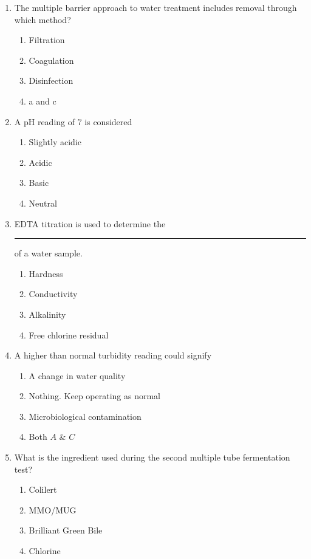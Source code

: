 \begin{enumerate}[1.]
\item  The multiple barrier approach to water treatment includes removal through which method?\\
\begin{enumerate}
\item Filtration\\
\item Coagulation\\
\item Disinfection\\
\item a and c
\end{enumerate}

\item  A pH reading of 7 is considered\\
\begin{enumerate}
\item Slightly acidic\\
\item Acidic\\
\item Basic\\
\item Neutral
\end{enumerate}

\item EDTA titration is used to determine the \rule{2cm}{0.3pt} of a water sample.
\begin{enumerate}
\item Hardness
\item Conductivity
\item Alkalinity
\item Free chlorine residual
\end{enumerate}

\item  A higher than normal turbidity reading could signify\\
\begin{enumerate}
\item A change in water quality\\
\item Nothing. Keep operating as normal\\
\item Microbiological contamination\\
\item Both $A$ \& $C$
\end{enumerate}

\item  What is the ingredient used during the second multiple tube fermentation test?\\
\begin{enumerate}
\item Colilert\\
\item MMO/MUG\\
\item Brilliant Green Bile\\
\item Chlorine
\end{enumerate}


\end{enumerate}
